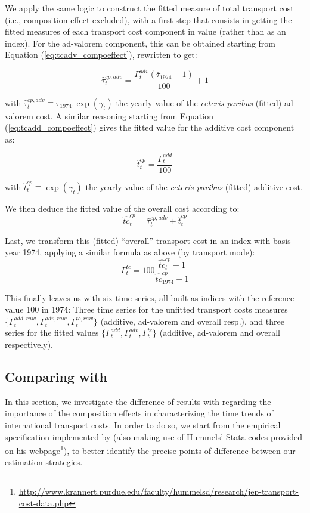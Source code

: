 \documentclass[a4paper,11pt]{article}
\begin{document}
We apply the same logic to construct the fitted measure of total transport cost (i.e., composition effect excluded), with a first step that consists in getting the fitted measures of each transport cost component in value (rather than as an index). For the ad-valorem component, this can be obtained starting from Equation (\ref{eq:tcadv_compoeffect}), rewritten to get:

$$\widehat{\tau}^{cp, adv}_t = \frac{\Gamma^{adv}_t \left(\bar{\tau}_{1974}-1\right)}{100} +1$$

with $\widehat{\tau}^{cp, adv}_t \equiv \bar{\tau}_{1974}.\exp(\gamma_t)$ the yearly value of the \textit{ceteris paribus} (fitted) ad-valorem cost. A similar reasoning starting from Equation (\ref{eq:tcadd_compoeffect}) gives the fitted value for the additive cost component as:

$$\widehat{t}^{cp}_t = \frac{\Gamma^{add}_t}{100}$$

with $\widehat{t}^{cp}_t \equiv \exp(\gamma_t)$ the yearly value of the \textit{ceteris paribus} (fitted) additive cost.


We then deduce the fitted value of the overall cost according to:
$$\widehat{tc}^{cp}_t= \widehat{\tau}^{cp, adv}_t  + \widehat{t}^{cp}_t$$

Last, we transform this (fitted) ``overall'' transport cost in an index with basis year 1974, applying a similar formula as above (by transport mode):
$$\Gamma^{tc}_t = 100\frac{\widehat{tc}^{cp}_t -1 }{\widehat{tc}^{cp}_{1974}-1}$$

This finally leaves us with six time series, all built as indices with the reference value 100 in 1974: Three time series for the unfitted transport costs measures $\{\Gamma^{add, raw}_t, \Gamma^{adv, raw}_t, \Gamma^{tc, raw}_t \}$  (additive, ad-valorem and overall resp.), and three series for the fitted values $\{\Gamma^{add}_t, \Gamma^{adv}_t, \Gamma^{tc}_t \}$ (additive, ad-valorem and overall respectively).

\subsection{Comparing with \cite{hummels2007} \label{app:compare_Hummels}}

In this section, we investigate the difference of results with \cite{hummels2007} regarding the importance of the composition effects in characterizing the time trends of international transport costs. In order to do so, we start from the empirical specification implemented by \cite{hummels2007} (also making use of Hummels' Stata codes provided on his webpage\footnote{\url{http://www.krannert.purdue.edu/faculty/hummelsd/research/jep-transport-cost-data.php}}), to better identify the precise points of difference between our estimation strategies.
\end{document}
